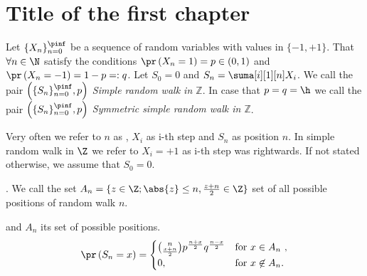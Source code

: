 \chapter{Title of the first chapter}

\begin{defn}\label{defn-simple_random_walk_Z}
 Let $\{X_n\}_{n=0}^\pinf$ be a sequence of \iid random variables with values in $\{ -1, +1\}$. That $\forall n \in \N$ satisfy the conditions $\pr \left( X_n=1 \right) =p \in \left( 0,1 \right) $ and $\pr \left( X_n=-1 \right) =1-p=:q$.
 Let $S_0=0$ and $S_n=\suma[i][1][n]X_i$. We call the pair $ \left( \{S_n\}_{n=0}^\pinf, p \right) $ \emph{Simple random walk in $\mathbb{Z}$}. In case that $p=q=\h $ we call the pair $ \left( \{S_n\}_{n=0}^\pinf, p \right) $ \emph{Symmetric simple random walk in $\mathbb{Z}$}.
\end{defn}

\begin{rem}
 Very often we refer to $n$ as \Time, $X_i$ as i-th step and $S_n$ as position \intime $n$.
 In simple random walk in $\Z$ we refer to $X_i=+1$ as i-th step was rightwards. If not stated otherwise, we assume that $S_0=0.$
\end{rem}

\begin{defn}\label{defn-set_all_possible_values}
 \Lrw. We call the set $A_n=\{z \in \Z; \abs{z}\leq n, \frac{z+n}{2}\in \Z \}$ set of all possible positions of random walk \rw \intime $n$.
\end{defn}


\begin{thm}\label{thm-probability_position_time}
 \Lrw and $A_n$ its set of possible positions.
 \[
 \pr \left( S_n=x \right) =
 \begin{cases}
 \binom{n}{\frac{x+n}{2}}p^{\frac{n+x}{2}}q^{\frac{n-x}{2}} & \text{for $x \in A_n$ },\\
 0, & \text{for $x \not\in A_n$}.
 \end{cases}
 \]
\end{thm}

